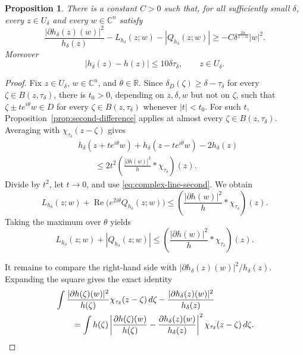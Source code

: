 \documentclass[12pt]{amsart}
\newtheorem{proposition}[theorem]{Proposition}
\newcommand{\C}{\mathbb C}
\begin{document}
\begin{proposition}\label{prop:mollification}
There is a constant $C>0$ such that, for all sufficiently small $\delta$,
every $z\in U_\delta$ and every $w\in\C^n$ satisfy
\begin{equation}\label{eq:mollifiedineq}
 \frac{|\partial h_\delta(z)(w)|^2}{h_\delta(z)}
 -L_{h_\delta}(z;w)-|Q_{h_\delta}(z;w)|
 \ge -C\delta^{\frac{2\alpha}{1-\alpha}}|w|^2.
\end{equation}
Moreover
\begin{equation}\label{eq:C0approx}
 |h_\delta(z)-h(z)|\le10\delta\tau_\delta,
 \qquad z\in U_\delta.
\end{equation}
\end{proposition}

\begin{proof}
Fix $z\in U_\delta$, $w\in\C^n$, and $\theta\in\mathbb R$. Since
$\delta_D(\zeta)\ge\delta-\tau_\delta$ for every
$\zeta\in B(z,\tau_\delta)$, there is $t_0>0$, depending on
$z,\delta,w$ but not on $\zeta$, such that
$\zeta\pm te^{i\theta}w\in D$ for every
$\zeta\in B(z,\tau_\delta)$ whenever $|t|<t_0$. For such $t$,
Proposition~\ref{prop:second-difference} applies at almost every
$\zeta\in B(z,\tau_\delta)$. Averaging with
$\chi_{\tau_\delta}(z-\zeta)$ gives
\begin{align*}
 &h_\delta(z+t e^{i\theta}w)+h_\delta(z-t e^{i\theta}w)-2h_\delta(z)\\
 &\qquad\le
 2t^2\left(\frac{|\partial h(w)|^2}{h}*\chi_{\tau_\delta}\right)(z).
\end{align*}
Divide by $t^2$, let $t\to0$, and use
\eqref{eq:complex-line-second}. We obtain
\[
 L_{h_\delta}(z;w)+\operatorname{Re}\bigl(e^{2i\theta}Q_{h_\delta}(z;w)\bigr)
 \le\left(\frac{|\partial h(w)|^2}{h}*\chi_{\tau_\delta}\right)(z).
\]
Taking the maximum over $\theta$ yields
\begin{equation}\label{eq:convineq}
 L_{h_\delta}(z;w)+|Q_{h_\delta}(z;w)|
 \le\left(\frac{|\partial h(w)|^2}{h}*\chi_{\tau_\delta}\right)(z).
\end{equation}

It remains to compare the right-hand side with
$|\partial h_\delta(z)(w)|^2/h_\delta(z)$. Expanding the square gives the
exact identity
\begin{align}\label{eq:variance-identity}
 &\int
 \frac{|\partial h(\zeta)(w)|^2}{h(\zeta)}
 \chi_{\tau_\delta}(z-\zeta)\,d\zeta
 -\frac{|\partial h_\delta(z)(w)|^2}{h_\delta(z)}\notag\\
 &\qquad=
 \int h(\zeta)
 \left|
 \frac{\partial h(\zeta)(w)}{h(\zeta)}
 -\frac{\partial h_\delta(z)(w)}{h_\delta(z)}
 \right|^2
 \chi_{\tau_\delta}(z-\zeta)\,d\zeta.
\end{align}


\end{proof}
\end{document}
